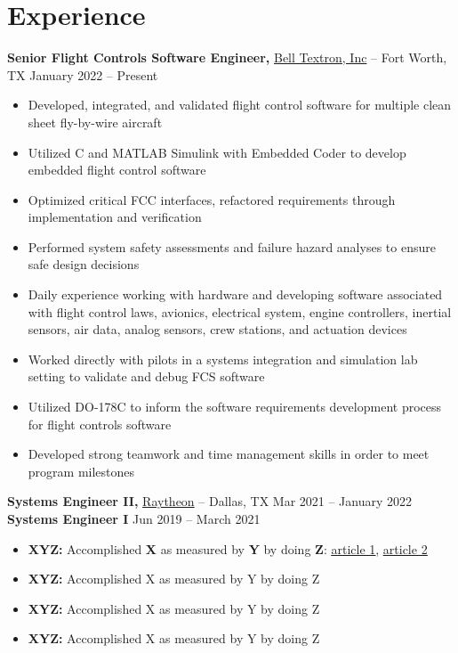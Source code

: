 \documentclass[11pt]{article}       %
\begin{document}
\section*{Experience}
\textbf{Senior Flight Controls Software Engineer,} \href{https://www.bellflight.com/}{Bell Textron, Inc} -- Fort Worth, TX \hfill January 2022 -- Present \\
\vspace{-9pt}
\begin{itemize}
  \item Developed, integrated, and validated flight control software for multiple clean sheet fly-by-wire aircraft
  \item Utilized C and MATLAB Simulink with Embedded Coder to develop embedded flight control software
  \item Optimized critical FCC interfaces, refactored requirements through implementation and verification
  \item Performed system safety assessments and failure hazard analyses to ensure safe design decisions
  \item Daily experience working with hardware and developing software associated with flight control laws, avionics, electrical system, engine controllers, inertial sensors, air data, analog sensors, crew stations, and actuation devices
  \item Worked directly with pilots in a systems integration and simulation lab setting to validate and debug FCS software
  \item Utilized DO-178C to inform the software requirements development process for flight controls software
  \item Developed strong teamwork and time management skills in order to meet program milestones
\end{itemize}

\textbf{Systems Engineer II,} \href{https://www.rtx.com/}{Raytheon} -- Dallas, TX \hfill Mar 2021 -- January 2022 \\
\textbf{Systems Engineer I} \hfill Jun 2019 -- March 2021 \\
\vspace{-9pt}
\begin{itemize}
  \item \textbf{XYZ:} Accomplished \textbf{X} as measured by \textbf{Y} by doing \textbf{Z}: \href{https://www.inc.com/bill-murphy-jr/google-recruiters-say-these-5-resume-tips-including-x-y-z-formula-will-improve-your-odds-of-getting-hired-at-google.html}{\underline{article 1}}, \href{https://elevenrecruiting.com/create-an-effective-resume-xyz-resume-format/}{\underline{article 2}}
  \item \textbf{XYZ:} Accomplished X as measured by Y by doing Z
  \item \textbf{XYZ:} Accomplished X as measured by Y by doing Z
  \item \textbf{XYZ:} Accomplished X as measured by Y by doing Z
\end{itemize}
\end{document}
